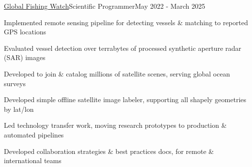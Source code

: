 \documentclass{article}
\begin{document}
\begin{**mylist}{\href{https://globalfishingwatch.org/}{Global Fishing Watch}}{Scientific Programmer}{May 2022 - March 2025}
\item Implemented remote sensing pipeline for detecting vessels \& matching to reported GPS locations
\item Evaluated vessel detection over terrabytes of processed synthetic aperture radar (SAR) images
\item Developed  to join \& catalog millions of satellite scenes, serving global ocean surveys
\item Developed simple offline satellite image labeler, supporting all shapely geometries by lat/lon
\item Led technology transfer work, moving research prototypes to production \& automated pipelines
\item Developed collaboration strategies \& best practices docs, for remote \& international teams
\end{**mylist}
\end{document}

